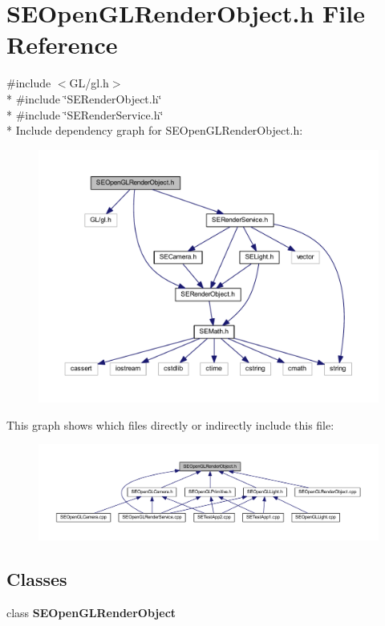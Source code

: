\section{S\+E\+Open\+G\+L\+Render\+Object.\+h File Reference}
\label{_s_e_open_g_l_render_object_8h}
{\ttfamily \#include $<$G\+L/gl.\+h$>$}\\*
{\ttfamily \#include \char`\"{}S\+E\+Render\+Object.\+h\char`\"{}}\\*
{\ttfamily \#include \char`\"{}S\+E\+Render\+Service.\+h\char`\"{}}\\*
Include dependency graph for S\+E\+Open\+G\+L\+Render\+Object.\+h\+:
\nopagebreak
\begin{figure}[H]
\begin{center}
\leavevmode
\includegraphics[width=350pt]{_s_e_open_g_l_render_object_8h__incl}
\end{center}
\end{figure}
This graph shows which files directly or indirectly include this file\+:
\nopagebreak
\begin{figure}[H]
\begin{center}
\leavevmode
\includegraphics[width=350pt]{_s_e_open_g_l_render_object_8h__dep__incl}
\end{center}
\end{figure}
\subsection*{Classes}
\begin{DoxyCompactItemize}
\item 
class {\bf S\+E\+Open\+G\+L\+Render\+Object}
\end{DoxyCompactItemize}
